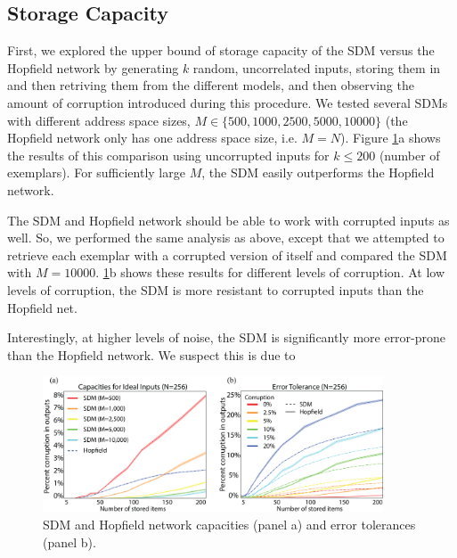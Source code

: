 \documentclass[10pt,letterpaper]{article}
\begin{document}
\subsection{Storage Capacity}

First, we explored the upper bound of storage capacity of the SDM
versus the Hopfield network by generating $k$ random, uncorrelated
inputs, storing them in and then retriving them from the different
models, and then observing the amount of corruption introduced during
this procedure. We tested several SDMs with different address space
sizes, $M\in\{500, 1000, 2500, 5000, 10000\}$ (the Hopfield network
only has one address space size, i.e. $M=N$).  Figure
\ref{fig:capacity}a shows the results of this comparison using
uncorrupted inputs for $k\leq 200$ (number of exemplars). For
sufficiently large $M$, the SDM easily outperforms the Hopfield
network.

The SDM and Hopfield network should be able to work with corrupted
inputs as well. So, we performed the same analysis as above, except
that we attempted to retrieve each exemplar with a corrupted version
of itself and compared the SDM with $M=10000$.  \ref{fig:capacity}b
shows these results for different levels of corruption. At low levels
of corruption, the SDM is more resistant to corrupted inputs than the
Hopfield net. 

Interestingly, at higher levels of noise, the SDM is significantly
more error-prone than the Hopfield network. We suspect this is due to


\begin{figure}[t!]
  \begin{center}
    \includegraphics[width=0.9\textwidth]{./figures/all-capacities.png}
    \caption{SDM and Hopfield network capacities (panel a) and error
      tolerances (panel b).}
    \label{fig:capacity}
  \end{center}
\end{figure}
\end{document}
